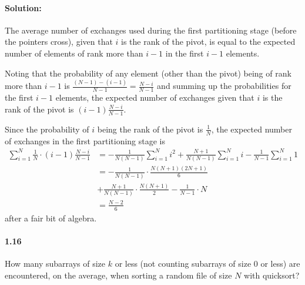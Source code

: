 \documentclass{article}
\begin{document}
\paragraph{Solution:} The average number of exchanges used during the first
partitioning stage (before the pointers cross), given that $i$ is the rank of
the pivot, is equal to the expected number of elements of rank more than $i -
1$ in the first $i - 1$ elements.

Noting that the probability of any element (other than the pivot) being of rank
more than $i - 1$ is $\frac{(N - 1) - (i - 1)}{N - 1} = \frac{N - i}{N - 1}$
and summing up the probabilities for the first $i - 1$ elements, the expected
number of exchanges given that $i$ is the rank of the pivot is $(i - 1)\frac{N
- i}{N - 1}$.

Since the probability of $i$ being the rank of the pivot is $\frac{1}{N}$, the
expected number of exchanges in the first partitioning stage is
\begin{align*}
  \sum_{i = 1}^N{\frac{1}{N} \cdot (i - 1)\frac{N - i}{N - 1}} &= -\frac{1}{N(N
    - 1)}\sum_{i = 1}^N{i^2} + \frac{N + 1}{N(N - 1)}\sum_{i = 1}^N{i} -
    \frac{1}{N - 1}\sum_{i = 1}^N{1} \\
    &= -\frac{1}{N(N - 1)} \cdot \frac{N(N + 1)(2N + 1)}{6} \\
      &+ \frac{N + 1}{N(N - 1)} \cdot \frac{N(N + 1)}{2} - \frac{1}{N - 1}
      \cdot N \\
    &= \frac{N - 2}{6}
\end{align*} after a fair bit of algebra.

\paragraph{1.16} How many subarrays of size $k$ or less (not counting subarrays
of size 0 or less) are encountered, on the average, when sorting a random file
of size $N$ with quicksort?
\end{document}
